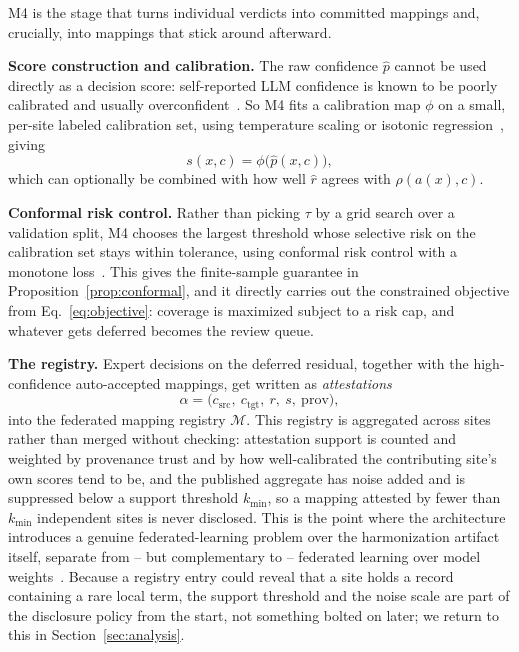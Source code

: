 \documentclass[conference]{IEEEtran}
\newcommand{\rel}{\rho}
\newcommand{\reg}{\mathcal{M}}
\begin{document}
M4 is the stage that turns individual verdicts into committed mappings and, crucially, into mappings that stick around afterward.

\textbf{Score construction and calibration.} The raw confidence $\hat{p}$ cannot be used directly as a decision score: self-reported LLM confidence is known to be poorly calibrated and usually overconfident~\cite{b19,b28}. So M4 fits a calibration map $\phi$ on a small, per-site labeled calibration set, using temperature scaling or isotonic regression~\cite{b19,b47}, giving
\begin{equation}
s(x,c) = \phi\big(\hat{p}(x,c)\big),
\end{equation}
which can optionally be combined with how well $\hat{r}$ agrees with $\rel(a(x),c)$.

\textbf{Conformal risk control.} Rather than picking $\tau$ by a grid search over a validation split, M4 chooses the largest threshold whose selective risk on the calibration set stays within tolerance, using conformal risk control with a monotone loss~\cite{b22,b23}. This gives the finite-sample guarantee in Proposition~\ref{prop:conformal}, and it directly carries out the constrained objective from Eq.~\eqref{eq:objective}: coverage is maximized subject to a risk cap, and whatever gets deferred becomes the review queue.

\textbf{The registry.} Expert decisions on the deferred residual, together with the high-confidence auto-accepted mappings, get written as \emph{attestations}
\begin{equation}
\alpha = \big(c_{\text{src}},\ c_{\text{tgt}},\ r,\ s,\ \mathrm{prov}\big),
\end{equation}
into the federated mapping registry $\reg$. This registry is aggregated across sites rather than merged without checking: attestation support is counted and weighted by provenance trust and by how well-calibrated the contributing site's own scores tend to be, and the published aggregate has noise added and is suppressed below a support threshold $k_{\min}$, so a mapping attested by fewer than $k_{\min}$ independent sites is never disclosed. This is the point where the architecture introduces a genuine federated-learning problem over the harmonization artifact itself, separate from -- but complementary to -- federated learning over model weights~\cite{b24,b25,b26}. Because a registry entry could reveal that a site holds a record containing a rare local term, the support threshold and the noise scale are part of the disclosure policy from the start, not something bolted on later; we return to this in Section~\ref{sec:analysis}.
\end{document}
